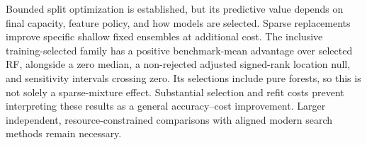 Bounded split optimization is established, but its predictive value depends
on final capacity, feature policy, and how models are selected. Sparse
replacements improve specific shallow fixed ensembles at additional cost.
The inclusive training-selected family has a positive benchmark-mean
advantage over selected RF, alongside a zero median, a non-rejected adjusted
signed-rank location null, and sensitivity intervals crossing zero.
Its selections include pure forests, so this is not solely a sparse-mixture
effect. Substantial selection and refit costs prevent interpreting these
results as a general accuracy--cost improvement. Larger independent,
resource-constrained comparisons with aligned modern search methods remain
necessary.
